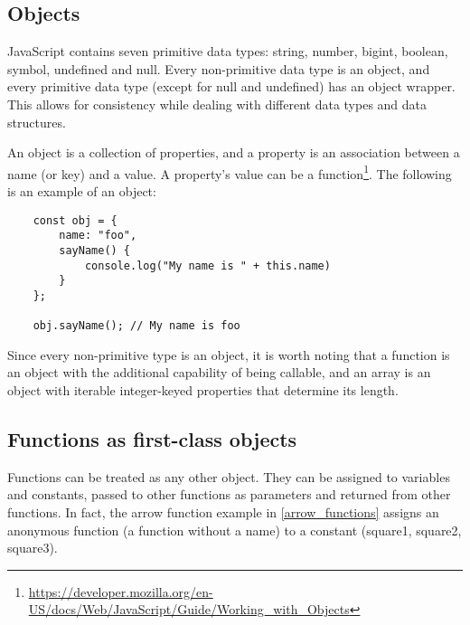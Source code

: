 \documentclass[11pt,a4paper]{article}
\begin{document}
\subsection{\label{objects}Objects}
JavaScript contains seven primitive data types: string, number, bigint, boolean, symbol, undefined and null.
Every non-primitive data type is an object,
and every primitive data type (except for null and undefined) has an object wrapper.
This allows for consistency while dealing with different data types and data structures.

An object is a collection of properties, and a property is an association between a name (or key) and a value.
A property's value can be a
function\footnote{\raggedright \url{https://developer.mozilla.org/en-US/docs/Web/JavaScript/Guide/Working_with_Objects}}.
The following is an example of an object:
\begin{verbatim}
    const obj = {
        name: "foo",
        sayName() {
            console.log("My name is " + this.name)
        }
    };

    obj.sayName(); // My name is foo
\end{verbatim}
Since every non-primitive type is an object, it is worth noting that
a function is an object with the additional capability of being callable,
and an array is an object with iterable integer-keyed properties that determine its length.

\subsection{\label{functions_first_class}Functions as first-class objects}
Functions can be treated as any other object.
They can be assigned to variables and constants, passed to other functions as parameters
and returned from other functions.
In fact, the arrow function example in \ref{arrow_functions}
assigns an anonymous function (a function without a name) to a constant (square1, square2, square3).
\end{document}
